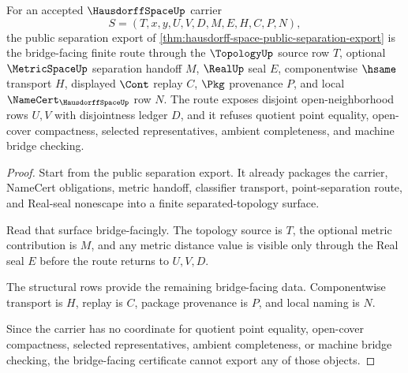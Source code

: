 \begin{theorem}
\label{thm:hausdorffspace-bridge-certificate}
For an accepted $\HausdorffSpaceUp$ carrier
$$
S=(T,x,y,U,V,D,M,E,H,C,P,N),
$$
the public separation export of \autoref{thm:hausdorff-space-public-separation-export} is the bridge-facing finite route through the $\TopologyUp$ source row $T$, optional $\MetricSpaceUp$ separation handoff $M$, $\RealUp$ seal $E$, componentwise $\hsame$ transport $H$, displayed $\Cont$ replay $C$, $\Pkg$ provenance $P$, and local $\NameCert_{\HausdorffSpaceUp}$ row $N$. The route exposes disjoint open-neighborhood rows $U,V$ with disjointness ledger $D$, and it refuses quotient point equality, open-cover compactness, selected representatives, ambient completeness, and machine bridge checking.
\end{theorem}
\begin{proof}
Start from the public separation export. It already packages the carrier, NameCert obligations, metric handoff, classifier transport, point-separation route, and Real-seal nonescape into a finite separated-topology surface.

Read that surface bridge-facingly. The topology source is $T$, the optional metric contribution is $M$, and any metric distance value is visible only through the Real seal $E$ before the route returns to $U,V,D$.

The structural rows provide the remaining bridge-facing data. Componentwise transport is $H$, replay is $C$, package provenance is $P$, and local naming is $N$.

Since the carrier has no coordinate for quotient point equality, open-cover compactness, selected representatives, ambient completeness, or machine bridge checking, the bridge-facing certificate cannot export any of those objects.
\end{proof}

